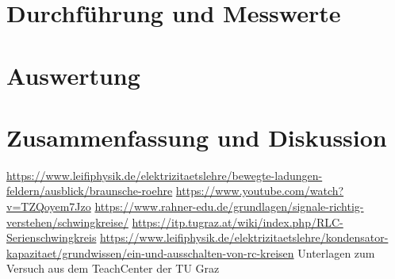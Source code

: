 \documentclass{article}
\begin{document}
\section{Durchführung und Messwerte}


\section{Auswertung}




\section{Zusammenfassung und Diskussion}







%

%


%


\begin{thebibliography}{9}
 \url{https://www.leifiphysik.de/elektrizitaetslehre/bewegte-ladungen-feldern/ausblick/braunsche-roehre}
 \url{https://www.youtube.com/watch?v=TZQoyem7Jzo}
 \url{https://www.rahner-edu.de/grundlagen/signale-richtig-verstehen/schwingkreise/}
 \url{https://itp.tugraz.at/wiki/index.php/RLC-Serienschwingkreis}
 \url{https://www.leifiphysik.de/elektrizitaetslehre/kondensator-kapazitaet/grundwissen/ein-und-ausschalten-von-rc-kreisen}
 Unterlagen zum Versuch aus dem TeachCenter der TU Graz

\end{thebibliography}
\end{document}
